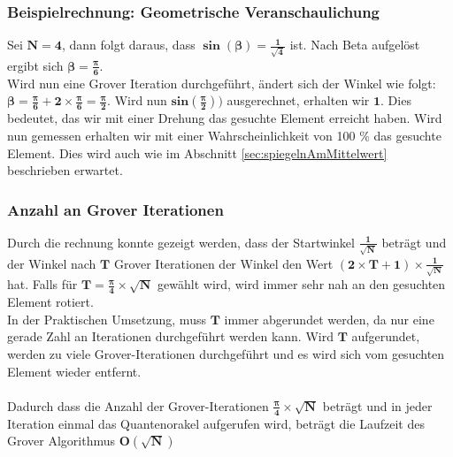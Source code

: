 \subsubsection{Beispielrechnung: Geometrische Veranschaulichung}
Sei $\mathbf{N=4}$, dann folgt daraus, dass $\mathbf{\sin(\beta) = \frac{1}{\sqrt{4}}}$ ist. Nach Beta aufgelöst ergibt sich $\mathbf{\beta = \frac{\pi}{6}}$.
\\
Wird nun eine Grover Iteration durchgeführt, ändert sich der Winkel wie folgt: $\mathbf{\beta = \frac{\pi}{6} + 2 \times \frac{\pi}{6}  = \frac{\pi}{2}}$. Wird nun $\mathbf{sin(\frac{\pi}{2}))}$ ausgerechnet, erhalten wir $\mathbf{1}$. Dies bedeutet, das wir mit einer Drehung das gesuchte Element erreicht haben. Wird nun gemessen erhalten wir mit einer Wahrscheinlichkeit von 100 \% das gesuchte Element. Dies wird auch wie im Abschnitt  \ref{sec:spiegelnAmMittelwert}  beschrieben erwartet.

\subsubsection{Anzahl an Grover Iterationen}
Durch die rechnung konnte gezeigt werden, dass der Startwinkel $\mathbf{\frac{1}{\sqrt{N}}}$ beträgt und der Winkel nach $\mathbf{T}$ Grover Iterationen der Winkel den Wert $\mathbf{(2 \times T + 1)\times \frac{1}{\sqrt{N}}}$ hat. 
Falls für $\mathbf{T = \frac{\pi}{4}\times \sqrt{N}}$ gewählt wird, wird immer sehr nah an den gesuchten Element rotiert. 
\\
In der Praktischen Umsetzung, muss $\mathbf{T}$ immer abgerundet werden, da nur eine gerade Zahl an Iterationen durchgeführt werden kann. Wird $\mathbf{T}$ aufgerundet, werden zu viele Grover-Iterationen durchgeführt und es wird sich vom gesuchten Element wieder entfernt.
\\
\\
Dadurch dass die Anzahl der Grover-Iterationen $\mathbf{ \frac{\pi}{4}\times \sqrt{N}}$ beträgt und in jeder Iteration einmal das Quantenorakel aufgerufen wird, beträgt die Laufzeit des Grover Algorithmus $\mathbf{O(\sqrt N)}$
